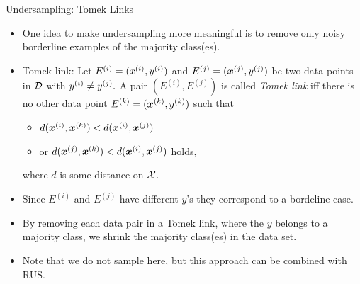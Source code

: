 	\begin{frame}{Undersampling: Tomek Links}
		
		\footnotesize{
			\begin{itemize}
				\item One idea to make undersampling more meaningful is to remove only noisy borderline examples of the majority class(es).
				\item Tomek link: Let $E^{(i)} = (x^{(i)},y^{(i)})$ and $E^{(j)} = (\bm{x}^{(j)},y^{(j)})$ be two data points in $\mathcal{D}$ with $y^{(i)}\neq y^{(j)}.$ A pair $(E^{(i)},E^{(j)})$ is called \emph{Tomek link} iff there is no other data point $E^{(k)} = (\bm{x}^{(k)},y^{(k)})$ such that
%				
				\begin{itemize} \footnotesize
%					
					\item [] $d(\bm{x}^{(i)}, \bm{x}^{(k)}) < d(\bm{x}^{(i)}, \bm{x}^{(j)}) $
					\item [] or $d(\bm{x}^{(j)}, \bm{x}^{(k)}) < d(\bm{x}^{(i)}, \bm{x}^{(j)}) $ holds,
%					
				\end{itemize}
%			
				where $d$ is some distance on $\mathcal{X}.$
					
			\end{itemize}
%						
			\begin{minipage}{0.55\textwidth}	
%				
			\begin{itemize} \footnotesize
				\item Since $E^{(i)}$ and $E^{(j)}$ have different $y$'s they correspond to a bordeline case.
				\item By removing each data pair in a Tomek link, where the $y$ belongs to a majority class, we shrink the majority class(es) in the data set. 
%				
				\item Note that we do not sample here, but this approach can be combined with RUS. 	
					

\end{itemize}
\end{minipage}}
\end{frame}
